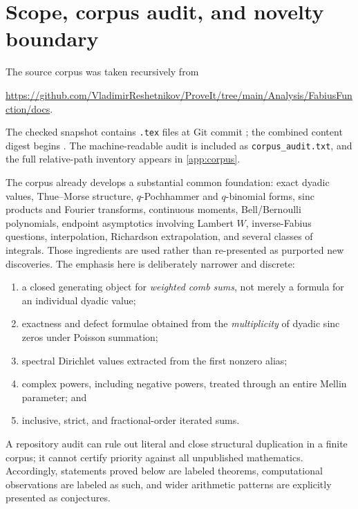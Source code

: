 \documentclass[11pt]{article}
\theoremstyle{definition}
\theoremstyle{remark}
\begin{document}
\tableofcontents

\section{Scope, corpus audit, and novelty boundary}

The source corpus was taken recursively from
\begin{center}
\url{https://github.com/VladimirReshetnikov/ProveIt/tree/main/Analysis/FabiusFunction/docs}.
\end{center}
The checked snapshot contains \CorpusFileCount{} \texttt{.tex} files at Git
commit \CorpusCommit; the combined content digest begins \CorpusDigest.  The
machine-readable audit is included as \texttt{corpus\_audit.txt}, and the full
relative-path inventory appears in \cref{app:corpus}.

The corpus already develops a substantial common foundation: exact dyadic
values, Thue--Morse structure, $q$-Pochhammer and $q$-binomial forms, sinc
products and Fourier transforms, continuous moments, Bell/Bernoulli
polynomials, endpoint asymptotics involving Lambert $W$, inverse-Fabius
questions, interpolation, Richardson extrapolation, and several classes of
integrals.  Those ingredients are used rather than re-presented as purported
new discoveries.  The emphasis here is deliberately narrower and discrete:

\begin{enumerate}[label=(\roman*),leftmargin=2.4em]
\item a closed generating object for \emph{weighted comb sums}, not merely a
      formula for an individual dyadic value;
\item exactness and defect formulae obtained from the \emph{multiplicity} of
      dyadic sinc zeros under Poisson summation;
\item spectral Dirichlet values extracted from the first nonzero alias;
\item complex powers, including negative powers, treated through an entire
      Mellin parameter; and
\item inclusive, strict, and fractional-order iterated sums.
\end{enumerate}

A repository audit can rule out literal and close structural duplication in a
finite corpus; it cannot certify priority against all unpublished mathematics.
Accordingly, statements proved below are labeled theorems, computational
observations are labeled as such, and wider arithmetic patterns are explicitly
presented as conjectures.
\end{document}
